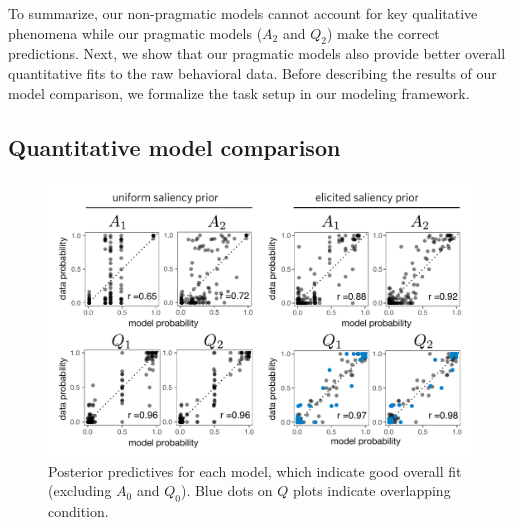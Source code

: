 \documentclass[11pt, floatsintext]{apa6}
\begin{document}

To summarize, our non-pragmatic models cannot account for key qualitative phenomena while our pragmatic models ($A_2$ and $Q_2$) make the correct predictions. 
Next, we show that our pragmatic models also provide better overall quantitative fits to the raw behavioral data. 
Before describing the results of our model comparison, we formalize the task setup in our modeling framework. 

\subsection{Quantitative model comparison}

\begin{figure}[tbh!]
\begin{center}
\includegraphics[scale = .77]{Exp1/ResultsFig.pdf}
\end{center}
\caption{Posterior predictives for each model, which indicate good overall fit (excluding $A_0$ and $Q_0$). Blue dots on $Q$ plots indicate overlapping condition.}
\label{fig:exp1predictives}
\end{figure}
\end{document}
